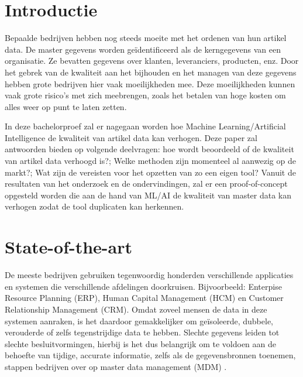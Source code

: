 
\section{Introductie}%
\label{sec:introductie}

Bepaalde bedrijven hebben nog steeds moeite met het ordenen van hun artikel data. De master gegevens worden geïdentificeerd als de kerngegevens van een organisatie. Ze bevatten gegevens over klanten, leveranciers, producten, enz. Door het gebrek van de kwaliteit aan het bijhouden en het managen van deze gegevens hebben grote bedrijven hier vaak moeilijkheden mee. Deze moeilijkheden kunnen vaak grote risico’s met zich meebrengen, zoals het betalen van hoge kosten om alles weer op punt te laten zetten. 

In deze bachelorproef zal er nagegaan worden hoe Machine Learning/Artificial Intelligence de kwaliteit van artikel data kan verhogen. Deze paper zal antwoorden bieden op volgende deelvragen: hoe wordt beoordeeld of de kwaliteit van artikel data verhoogd is?; Welke methoden zijn momenteel al aanwezig op de markt?; Wat zijn de vereisten voor het opzetten van zo een eigen tool? Vanuit de resultaten van het onderzoek en de ondervindingen, zal er een proof-of-concept opgesteld worden die aan de hand van ML/AI de kwaliteit van master data kan verhogen zodat de tool duplicaten kan herkennen.


\section{State-of-the-art}%
\label{sec:state-of-the-art}


De meeste bedrijven gebruiken tegenwoordig honderden verschillende applicaties en systemen die verschillende afdelingen doorkruisen. Bijvoorbeeld: Enterpise Resource Planning (ERP), Human Capital Management (HCM) en Customer Relationship Management (CRM). Omdat zoveel mensen de data in deze systemen aanraken, is het daardoor gemakkelijker om geïsoleerde, dubbele, verouderde of zelfs tegenstrijdige data te hebben. Slechte gegevens leiden tot slechte besluitvormingen, hierbij is het dus belangrijk om te voldoen aan de behoefte van tijdige, accurate informatie, zelfs als de gegevensbronnen toenemen, stappen bedrijven over op master data management (MDM) \autocite{SAP}.

